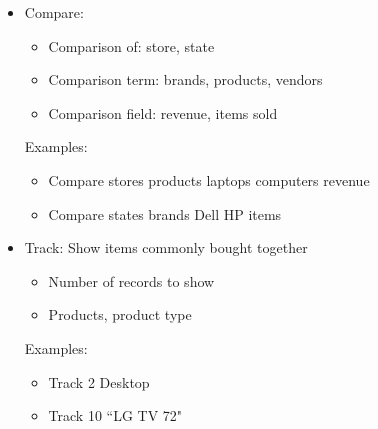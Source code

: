\documentclass[12pt]{article}
\begin{document}
\begin{itemize}
      \item
        Compare:
        \begin{itemize}
          \item Comparison of: store, state
          \item Comparison term: brands, products, vendors
          \item Comparison field: revenue, items sold
        \end{itemize}
        Examples:
        \begin{itemize}
          \item Compare stores products laptops computers revenue 
          \item Compare states brands Dell HP items
        \end{itemize}

      \item
        Track: Show items commonly bought together
        \begin{itemize}
          \item Number of records to show
          \item Products, product type
        \end{itemize}
        Examples:
        \begin{itemize}
          \item Track 2 Desktop
          \item Track 10 ``LG TV 72"
        \end{itemize}
    \end{itemize}

  
\end{document}
